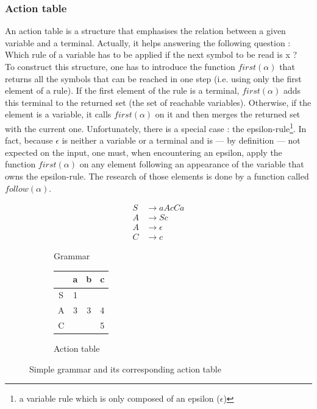 \documentclass[a4paper,11pt]{article}
\begin{document}
    \subsubsection{Action table}
      \label{subsubsec:actionTable}
      An action table is a structure that emphasises the relation between a given variable and a terminal. Actually, it helps answering the following question : Which rule of a variable has to be applied if the next symbol to be read is x ?\\
      To construct this structure, one has to introduce the function $first(\alpha)$ that returns all the symbols that can be reached in one step (i.e. using only the first element of a rule). If the first element of the rule is a terminal, $first(\alpha)$ adds this terminal to the returned set (the set of reachable variables). Otherwise, if the element is a variable, it calls $first(\alpha)$ on it and then merges the returned set with the current one. Unfortunately, there is a special case : the epsilon-rule\footnote{a variable rule which is only composed of an epsilon ($\epsilon$)}. In fact, because $\epsilon$ is neither a variable or a terminal and is --- by definition --- not expected on the input, one must, when encountering an epsilon, apply the function $first(\alpha)$ on any element following an appearance of the variable that owns the epsilon-rule. The research of those elements is done by a function called $follow(\alpha)$.
      \begin{figure}[h!]
        \centering
        \begin{subfigure}[b]{0.4\textwidth}
            \centering
            \begin{align}
              S &\rightarrow aAcCa \\
              A &\rightarrow Sc \\
              A &\rightarrow \epsilon \\
              C &\rightarrow c
            \end{align}
            \caption{Grammar}
            \label{fig:simplegrammar}
        \end{subfigure}
        \begin{subfigure}[b]{0.4\textwidth}
            \centering
            \begin{tabular}{|c||c|c|c|}
              \hline
                & a & b & c \\
              \hline
              \hline
              S & 1 &   &   \\
              \hline
              A & 3 & 3 & 4 \\
              \hline
              C &   &   & 5 \\
              \hline
            \end{tabular}
            \caption{Action table}
            \label{fig:simplegrammaractiontable}
        \end{subfigure}
        \caption{Simple grammar and its corresponding action table}
        \label{}
      \end{figure}
      
\end{document}
